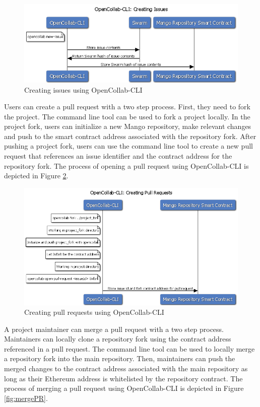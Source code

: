 \begin{figure}[]
  \centering
  \includegraphics[width=\linewidth,keepaspectratio]{figures/OpenCollab-CLI-Creating-Issues.png}
  \caption{Creating issues using OpenCollab-CLI}
  \label{fig:issue}
\end{figure}

Users can create a pull request with a two step process. First, they need to
fork the project. The command line tool can be used to fork a project locally.
In the project fork, users can initialize a new Mango repository, make relevant
changes and push to the smart contract address associated with the repository fork.
After pushing a project fork, users can use the command line tool to create a
new pull request that references an issue identifier and the contract address
for the repository fork. The process of opening a pull request using
OpenCollab-CLI is depicted in Figure \ref{fig:openPR}.

\begin{figure}[]
  \centering
  \includegraphics[width=\linewidth,keepaspectratio]{figures/OpenCollab-CLI-Creating-Pull-Requests.png}
  \caption{Creating pull requests using OpenCollab-CLI}
  \label{fig:openPR}
\end{figure}

A project maintainer can merge a pull request with a two step process.
Maintainers can locally clone a repository fork using the contract address
referenced in a pull request. The command line tool can be used to locally merge
a repository fork into the main repository. Then, maintainers can push the
merged changes to the contract address associated with the main repository as
long as their Ethereum address is whitelisted by the repository contract. The
process of merging a pull request using OpenCollab-CLI is depicted in Figure \ref{fig:mergePR}.

